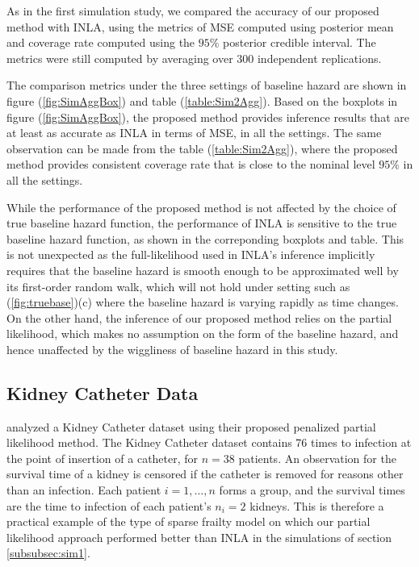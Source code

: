 \documentclass[ba]{imsart}
\begin{document}
As in the first simulation study, we compared the accuracy of our proposed method with INLA, using the metrics of MSE computed using posterior mean and coverage rate computed using the $95\%$ posterior credible interval. The metrics were still computed by averaging over 300 independent replications.



The comparison metrics under the three settings of baseline hazard are shown in figure (\ref{fig:SimAggBox}) and table (\ref{table:Sim2Agg}). Based on the boxplots in figure (\ref{fig:SimAggBox}), the proposed method provides inference results that are at least as accurate as INLA in terms of MSE, in all the settings. The same observation can be made from the table (\ref{table:Sim2Agg}), where the proposed method provides consistent coverage rate that is close to the nominal level $95\%$ in all the settings. 

While the performance of the proposed method is not affected by the choice of true baseline hazard function, the performance of INLA is sensitive to the true baseline hazard function, as shown in the correponding boxplots and table. This is not unexpected as the full-likelihood used in INLA's inference implicitly requires that the baseline hazard is smooth enough to be approximated well by its first-order random walk, which will not hold under setting such as (\ref{fig:truebase})(c) where the baseline hazard is varying rapidly as time changes. On the other hand, the inference of our proposed method relies on the partial likelihood, which makes no assumption on the form of the baseline hazard, and hence unaffected by the wiggliness of baseline hazard in this study. 


\subsection{Kidney Catheter Data}\label{subsec:kidney}

\cite{freqPL} analyzed a Kidney Catheter dataset using their proposed penalized partial likelihood method. The Kidney Catheter dataset contains 76 times to infection at the point of insertion of a catheter, for $n = 38$ patients. An observation for the survival time of a kidney is censored if the catheter is removed for reasons other than an infection.  Each patient $i=1,\ldots,n$ forms a group, and the survival times are the time to infection of each patient's $n_{i} = 2$ kidneys. This is therefore a practical example of the type of sparse frailty model on which our partial likelihood approach performed better than INLA in the simulations of section \ref{subsubsec:sim1}.
\end{document}
